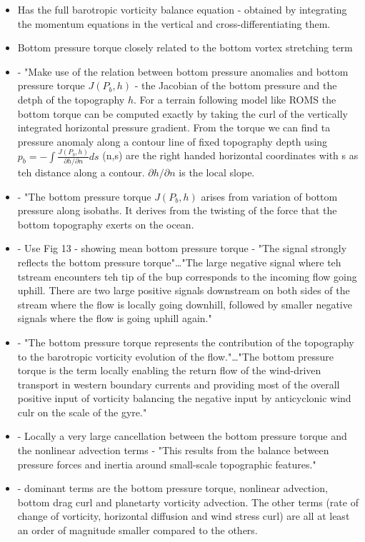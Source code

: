 \documentclass[..\Papers.tex]{subfiles}
\begin{document}
\begin{itemize}
    \item Has the full barotropic vorticity balance equation - obtained by integrating the momentum equations in the vertical and cross-differentiating them.
    \item Bottom pressure torque closely related to the bottom vortex stretching term \citep{Zhang207}
    \item - "Make use of the relation between bottom pressure anomalies and bottom pressure torque $J(P_b,h)$ - the Jacobian of the bottom pressure and the detph of the topography $h$. For a terrain following model like ROMS  the bottom torque can be computed exactly by taking the curl of the vertically integrated horizontal pressure gradient. From the torque we can find ta pressure anomaly along a contour line of fixed topography depth using $p_b=-\int\frac{J(P_b,h)}{\partial h/\partial n}ds$ (n,s) are the right handed horizontal coordinates with s as teh distance along a contour. $\partial h/\partial n$ is the local slope.\\
    \item - "The bottom pressure torque $J(P_b,h)$ arises from variation of bottom pressure along isobaths. It derives from the twisting of the force that the bottom topography exerts on the ocean.
    \item - Use Fig 13 - showing mean bottom pressure torque - "The signal strongly reflects the bottom pressure torque"\ldots "The large negative signal where teh tstream encounters teh tip of the bup corresponds to the incoming flow going uphill. There are two large positive signals downstream on both sides of the stream where the flow is locally going downhill, followed by smaller negative signals where the flow is going uphill again."
    \item - "The bottom pressure torque represents the contribution of the topography to the barotropic vorticity evolution of the flow."\ldots "The bottom pressure torque is the term locally enabling the return flow of the wind-driven transport in western boundary currents and providing most of the overall positive input of vorticity balancing the negative input by anticyclonic wind culr on the scale of the gyre."
    \item - Locally a very large cancellation between the bottom pressure torque and the nonlinear advection terms - "This results from the balance between pressure forces and inertia around small-scale topographic features."
    \item - dominant terms are the bottom pressure torque, nonlinear advection, bottom drag curl and planetarty vorticity advection. The other terms (rate of change of vorticity, horizontal diffusion and wind stress curl) are all at least an order of magnitude smaller compared to the others.

\end{itemize}
\end{document}
